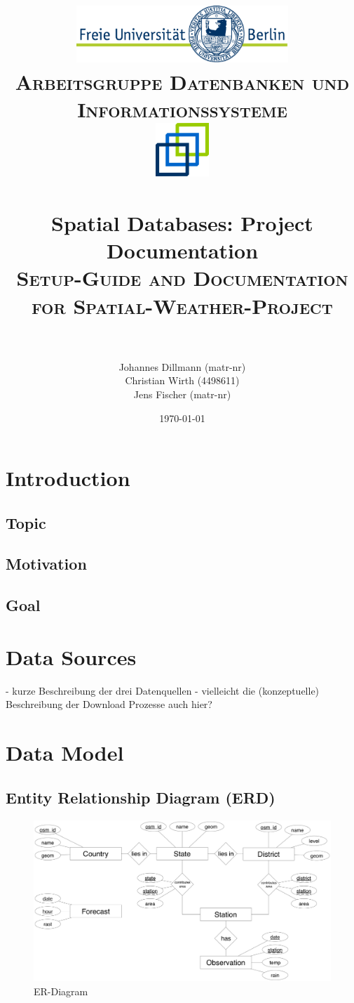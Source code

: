 \documentclass[paper=a4, fontsize=11pt]{scrartcl} %
\title{	
\normalfont \normalsize 
\textsc{\includegraphics[width=0.6\textwidth]{pictures/logo} \\ [5pt] Arbeitsgruppe Datenbanken und Informationssysteme \\ [20pt] \includegraphics[width=0.15\textwidth]{pictures/DBIS_Logo_rgb_web.png}} \\ [10pt] %
\horrule{0.5pt} \\[0.4cm] %
\huge Spatial Databases: Project Documentation \\ %
\normalsize \textsc{Setup-Guide and Documentation for Spatial-Weather-Project} \\ [0.4cm]
\horrule{2pt} \\[0.5cm] %
}
\author{Johannes Dillmann (matr-nr) \\ Christian Wirth (4498611) \\ Jens Fischer (matr-nr)}
\date{\normalsize\today} %
\numberwithin{equation}{section} %
\numberwithin{figure}{section} %
\numberwithin{table}{section} %
\begin{document}
\begin{titlepage}
\maketitle
\thispagestyle{empty}
\end{titlepage}

\newpage
\setcounter{page}{1}
\tableofcontents

\newpage
\listoffigures
{}

\newpage
{}
\pagestyle{fancy}
\setcounter{page}{1}

\section{Introduction}
	\subsection{Topic}
	\subsection{Motivation}
	\subsection{Goal}
\section{Data Sources}
	- kurze Beschreibung der drei Datenquellen
	- vielleicht die (konzeptuelle) Beschreibung der Download Prozesse auch hier?
	
\section{Data Model}
\subsection{Entity Relationship Diagram (ERD) }
  \begin{figure}[htbp]
  \includegraphics[width=1\textwidth]{pictures/er-model}
  \caption{ER-Diagram}
  \end{figure}
\end{document}
